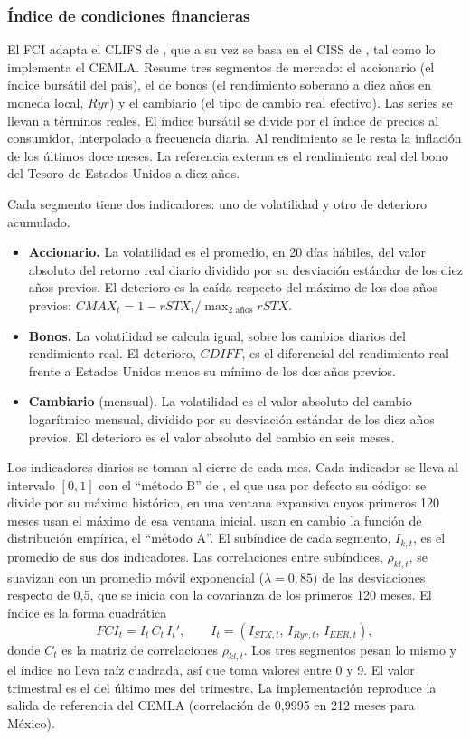 \subsubsection{Índice de condiciones financieras}

El FCI adapta el CLIFS de \citet{Duprey2017}, que a su vez se basa en el CISS de \citet{HolloKremerLoDuca2012}, tal como lo implementa el CEMLA. Resume tres segmentos de mercado: el accionario (el índice bursátil del país), el de bonos (el rendimiento soberano a diez años en moneda local, $Ryr$) y el cambiario (el tipo de cambio real efectivo). Las series se llevan a términos reales. El índice bursátil se divide por el índice de precios al consumidor, interpolado a frecuencia diaria. Al rendimiento se le resta la inflación de los últimos doce meses. La referencia externa es el rendimiento real del bono del Tesoro de Estados Unidos a diez años.

Cada segmento tiene dos indicadores: uno de volatilidad y otro de deterioro acumulado.
\begin{itemize}
    \item \textbf{Accionario.} La volatilidad es el promedio, en 20 días hábiles, del valor absoluto del retorno real diario dividido por su desviación estándar de los diez años previos. El deterioro es la caída respecto del máximo de los dos años previos: $CMAX_t=1-rSTX_t/\max_{2\text{ años}} rSTX$.
    \item \textbf{Bonos.} La volatilidad se calcula igual, sobre los cambios diarios del rendimiento real. El deterioro, $CDIFF$, es el diferencial del rendimiento real frente a Estados Unidos menos su mínimo de los dos años previos.
    \item \textbf{Cambiario} (mensual). La volatilidad es el valor absoluto del cambio logarítmico mensual, dividido por su desviación estándar de los diez años previos. El deterioro es el valor absoluto del cambio en seis meses.
\end{itemize}
Los indicadores diarios se toman al cierre de cada mes. Cada indicador se lleva al intervalo $[0,1]$ con el ``método B'' de \citet{OssandonBusch2022}, el que usa por defecto su código: se divide por su máximo histórico, en una ventana expansiva cuyos primeros 120 meses usan el máximo de esa ventana inicial. \citet{Duprey2017} usan en cambio la función de distribución empírica, el ``método A''. El subíndice de cada segmento, $I_{k,t}$, es el promedio de sus dos indicadores. Las correlaciones entre subíndices, $\rho_{kl,t}$, se suavizan con un promedio móvil exponencial ($\lambda=0{,}85$) de las desviaciones respecto de 0,5, que se inicia con la covarianza de los primeros 120 meses. El índice es la forma cuadrática
\[ FCI_t=I_t\,C_t\,I_t', \qquad I_t=(I_{STX,t},\,I_{Ryr,t},\,I_{EER,t}), \]
donde $C_t$ es la matriz de correlaciones $\rho_{kl,t}$. Los tres segmentos pesan lo mismo y el índice no lleva raíz cuadrada, así que toma valores entre 0 y 9. El valor trimestral es el del último mes del trimestre. La implementación reproduce la salida de referencia del CEMLA (correlación de 0,9995 en 212 meses para México).

